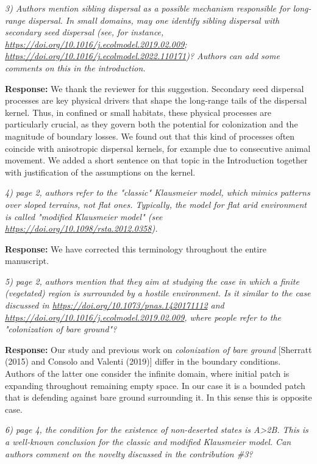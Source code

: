 \documentclass[11pt,a4paper]{article}
\newcommand{\comment}[1]{\vspace{0.5em}\noindent\textit{\textcolor{revcolor}{#1}}}
\newcommand{\response}[1]{\vspace{0.5em}\noindent\textbf{\textcolor{authorcolor}{Response:}} \textcolor{authorcolor}{#1}}
\begin{document}
\comment{3) Authors mention sibling dispersal as a possible mechanism responsible for long-range dispersal. In small domains, may one identify sibling dispersal with secondary seed dispersal (see, for instance, \url{https://doi.org/10.1016/j.ecolmodel.2019.02.009}; \url{https://doi.org/10.1016/j.ecolmodel.2022.110171})? Authors can add some comments on this in the introduction.}

\response{We thank the reviewer for this suggestion. Secondary seed dispersal processes are key physical drivers that shape the long-range tails of the dispersal kernel. Thus, in confined or small habitats, these physical processes are particularly crucial, as they govern both the potential for colonization and the magnitude of boundary losses. We found out that this kind of processes often coincide with anisotropic dispersal kernels, for example due to consecutive animal movement. We added a short sentence on that topic in the Introduction together with justification of the assumptions on the kernel.}

\comment{4) page 2, authors refer to the "classic" Klausmeier model, which mimics patterns over sloped terrains, not flat ones. Typically, the model for flat arid environment is called "modified Klausmeier model" (see \url{https://doi.org/10.1098/rsta.2012.0358}).}

\response{We have corrected this terminology throughout the entire manuscript.}

\comment{5) page 2, authors mention that they aim at studying the case in which a finite (vegetated) region is surrounded by a hostile environment. Is it similar to the case discussed in \url{https://doi.org/10.1073/pnas.1420171112} and \url{https://doi.org/10.1016/j.ecolmodel.2019.02.009}, where people refer to the "colonization of bare ground"?}

\response{
Our study and previous work on \textit{colonization of bare ground} [Sherratt (2015) and Consolo and Valenti (2019)] differ in the boundary conditions. Authors of the latter one consider the infinite domain, where initial patch is expanding throughout remaining empty space. In our case it is a bounded patch that is defending against bare ground surrounding it. In this sense this is opposite case.}

\comment{6) page 4, the condition for the existence of non-deserted states is A>2B. This is a well-known conclusion for the classic and modified Klausmeier model. Can authors comment on the novelty discussed in the contribution \#3?}
\end{document}
